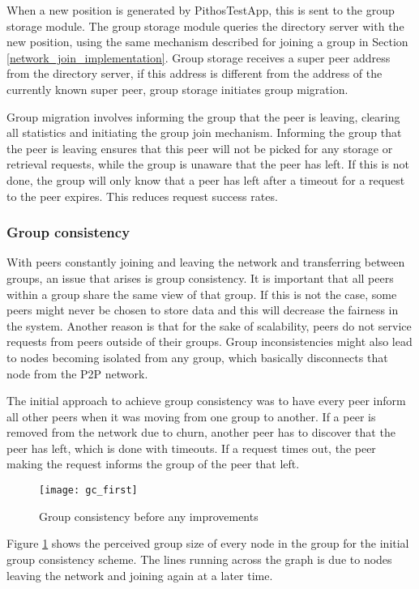     When a new position is generated by PithosTestApp, this is sent to the group storage module. The group storage module queries the directory server with the new position, using the same mechanism described for joining a group in Section \ref{network_join_implementation}. Group storage receives a super peer address from the directory server, if this address is different from the address of the currently known super peer, group storage initiates group migration.

    Group migration involves informing the group that the peer is leaving, clearing all statistics and initiating the group join mechanism. Informing the group that the peer is leaving ensures that this peer will not be picked for any storage or retrieval requests, while the group is unaware that the peer has left. If this is not done, the group will only know that a peer has left after a timeout for a request to the peer expires. This reduces request success rates.

    \subsubsection{Group consistency}
    \label{group_consistency_implementation}

    With peers constantly joining and leaving the network and transferring between groups, an issue that arises is group consistency. It is important that all peers within a group share the same view of that group. If this is not the case, some peers might never be chosen to store data and this will decrease the fairness in the system. Another reason is that for the sake of scalability, peers do not service requests from peers outside of their groups. Group inconsistencies might also lead to nodes becoming isolated from any group, which basically disconnects that node from the P2P network.

The initial approach to achieve group consistency was to have every peer inform all other peers when it was moving from one group to another. If a peer is removed from the network due to churn, another peer has to discover that the peer has left, which is done with timeouts. If a request times out, the peer making the request informs the group of the peer that left.

\begin{figure}[htbp]
 \centering
 \texttt{[image: gc\_first]}
 \caption{Group consistency before any improvements}
 \label{fig_gc_first}
\end{figure}
%
Figure \ref{fig_gc_first} shows the perceived group size of every node in the group for the initial group consistency scheme. The lines running across the graph is due to nodes leaving the network and joining again at a later time.


